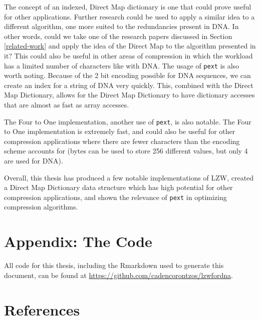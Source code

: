 \documentclass[12pt,twoside]{reedthesis}
\begin{document}
The concept of an indexed, Direct Map dictionary is one that could prove useful for other applications. Further research could be used to apply a similar idea to a different algorithm, one more suited to the redundancies present in DNA. In other words, could we take one of the research papers discussed in Section \ref{related-work} and apply the idea of the Direct Map to the algorithm presented in it? This could also be useful in other areas of compression in which the workload has a limited number of characters like with DNA. The usage of \texttt{pext} is also worth noting. Because of the 2 bit encoding possible for DNA sequences, we can create an index for a string of DNA very quickly. This, combined with the Direct Map Dictionary, allows for the Direct Map Dictionary to have dictionary accesses that are almost as fast as array accesses.

The Four to One implementation, another use of \texttt{pext}, is also notable. The Four to One implementation is extremely fast, and could also be useful for other compression applications where there are fewer characters than the encoding scheme accounts for (bytes can be used to store 256 different values, but only 4 are used for DNA).

Overall, this thesis has produced a few notable implementations of LZW, created a Direct Map Dictionary data structure which has high potential for other compression applications, and shown the relevance of \texttt{pext} in optimizing compression algorithms.

\appendix

\hypertarget{appendix-the-code}{%
\chapter{Appendix: The Code}\label{appendix-the-code}}

All code for this thesis, including the Rmarkdown used to generate this document, can be found at \url{https://github.com/cadencorontzos/lzwfordna}.

\backmatter

\hypertarget{references}{%
\chapter*{References}\label{references}}


\noindent

\setlength{\parindent}{-0.20in}
\end{document}
